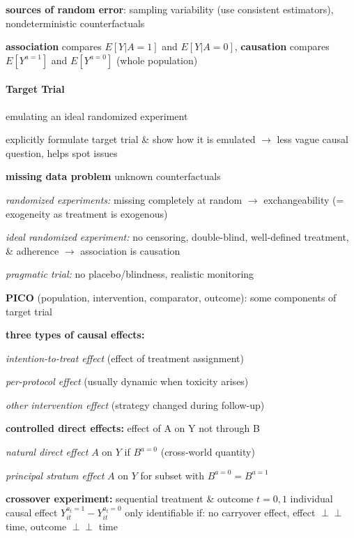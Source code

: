 \documentclass[8pt,twoside]{extarticle}
\renewcommand{\indent}{\hspace*{15pt}}
\newcommand{\indep}{\perp \!\!\! \perp}
\begin{document}
\begin{multicols}{2}
 \textbf{sources of random error}: sampling variability (use consistent estimators), nondeterministic counterfactuals

\textbf{association} compares $E\left[Y|A=1\right]$ and $E\left[Y|A=0\right]$, \textbf{causation} compares $E\left[Y^{a=1}\right]$ and $E\left[Y^{a=0}\right]$ (whole population)









\paragraph{Target Trial} emulating an ideal randomized experiment

 explicitly formulate target trial \& show how it is emulated $\rightarrow$ \newline less vague causal question, helps spot issues

 \textbf{missing data problem} unknown counterfactuals

 \textit{randomized experiments:} missing completely at random $\rightarrow$ exchangeability (= exogeneity as treatment is exogenous)

 \textit{ideal randomized experiment:} no censoring, double-blind, well-defined treatment, \& adherence $\rightarrow$ association is causation

 \textit{pragmatic trial:} no placebo/blindness, realistic monitoring


 \textbf{PICO} (population, intervention, comparator, outcome): some components of target trial

 \textbf{three types of causal effects:}

\indent \textit{intention-to-treat effect} (effect of treatment assignment)

\indent \textit{per-protocol effect} (usually dynamic when toxicity arises)

\indent \textit{other intervention effect} (strategy changed during follow-up)


 \textbf{controlled direct effects:} effect of A on Y not through B

\indent \textit{natural direct effect}  $A$ on $Y$ if $B^{a=0}$ (cross-world quantity)

\indent \textit{principal stratum effect} $A$ on $Y$ for subset with $B^{a=0} = B^{a=1}$

 \textbf{crossover experiment:} sequential treatment \& outcome $t{=}0,1$
\newline
individual causal effect $Y_{it}^{a_t=1} - Y_{it}^{a_t=0}$ only identifiable if: no carryover effect, effect $\indep$ time, outcome $\indep$ time


\end{multicols}
\end{document}
